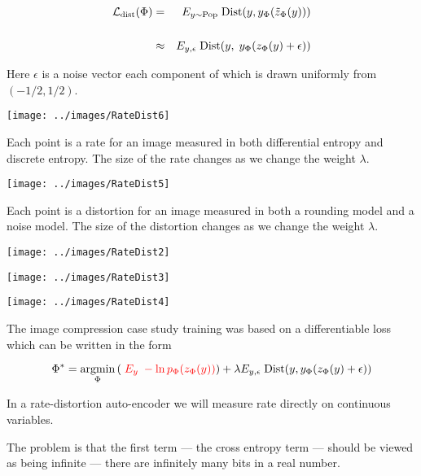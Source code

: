 {\begin{eqnarray*}
{\cal L}_{\mathrm{dist}}(\Phi) & = & E_{y \sim \mathrm{Pop}} \;\mathrm{Dist}(y,y_\Phi(\tilde{z}_\Phi(y))) \\
\\
& \approx & E_{y,\epsilon} \;\mathrm{Dist}(y,\;y_\Phi(z_\Phi(y) + \epsilon))
\end{eqnarray*}

\vfill
Here $\epsilon$ is a noise vector each component of which is drawn uniformly from $(-1/2,1/2)$.


\bigskip
\centerline{\texttt{[image: ../images/RateDist6]}}

Each point is a rate for an image measured in both differential entropy and discrete entropy.  The size of the rate changes as we change the weight $\lambda$.


\centerline{\texttt{[image: ../images/RateDist5]}}

Each point is a distortion for an image measured in both a rounding model and a noise model.  The size of the distortion changes as we change the weight $\lambda$.


\bigskip
\centerline{\texttt{[image: ../images/RateDist2]}}


\bigskip
\centerline{\texttt{[image: ../images/RateDist3]}}


\bigskip
\centerline{\texttt{[image: ../images/RateDist4]}}


The image compression case study training was based on a differentiable loss which can be written in the form

\vfill
$$\Phi^* = \operatorname*{argmin}_\Phi \left(\;{\color{red} E_y\;- \ln p_\Phi(z_\Phi(y))}\right) + \lambda E_{y,\epsilon}\; \mathrm{Dist}(y,y_\Phi(z_\Phi(y) + \epsilon))$$

\vfill
In a rate-distortion auto-encoder we will measure rate directly on continuous variables.

\vfill
The problem is that the first term --- the cross entropy term --- should be viewed as being infinite --- there are infinitely many bits in a real number.

}
